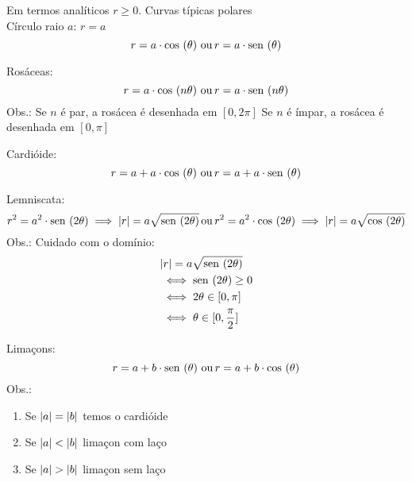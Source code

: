 \documentclass{article}
\begin{document}
    Em termos analíticos $r \ge 0$.
    Curvas típicas polares \\

       Círculo raio $a$: $r = a$ \\
       $$
            r = a \cdot \mathrm{cos}\, \left( \theta \right) \, \mathrm{ou} \, r = a \cdot \mathrm{sen}\, \left( \theta \right)
       $$
       
       
       Rosáceas: 
       \begin{equation*}
           r = a \cdot \mathrm{cos}\, \left( n \theta \right)\, \mathrm{ ou} \,
           r = a \cdot \mathrm{sen}\, \left( n \theta \right)
       \end{equation*}
       Obs.: Se $n$ é par, a rosácea é desenhada em $ [ 0, 2 \pi ]$
             Se $n$ é ímpar, a rosácea é desenhada em $ [ 0, \pi ]$
       
       
       Cardióide: 
       \begin{equation*}
            r = a + a \cdot \mathrm{cos}\, \left( \theta \right)\, \mathrm{ou}\, r = a + a \cdot \mathrm{sen}\, \left( \theta \right)
       \end{equation*}

       
       Lemniscata: 
       \begin{equation*}
           r^2 = a^2 \cdot \mathrm{sen}\, \left( 2\theta \right) \implies \lvert r \rvert = a \sqrt{ \mathrm{sen}\, \left( 2\theta \right) } \, \mathrm{ou} \, r^2 = a^2 \cdot \mathrm{cos}\, \left( 2\theta \right) \implies \lvert r \rvert = a \sqrt{ \mathrm{cos}\, \left( 2\theta \right) } \\
       \end{equation*}
       Obs.: Cuidado com o domínio: 
       \begin{align*}
            & \lvert r \rvert = a \sqrt{ \mathrm{sen}\, \left( 2 \theta \right) } \\
            & \iff \mathrm{sen}\, \left( 2 \theta \right) \ge 0  \\
            & \iff 2 \theta \in [0, \pi] \\
            & \iff \theta \in [0, \frac{\pi}{2} ] \\
       \end{align*}
       
       
       Limaçons: \\
       $$
        r = a + b \cdot \mathrm{sen}\, \left( \theta \right) \, \mathrm{ou} \,
        r = a + b \cdot \mathrm{cos}\, \left( \theta \right) 
        $$
       Obs.:
       \begin{enumerate}[i]
           \item Se $\lvert a \rvert = \lvert b \rvert$ temos o cardióide
           \item Se $\lvert a \rvert < \lvert b \rvert$ limaçon com laço
           \item Se $\lvert a \rvert > \lvert b \rvert$ limaçon sem laço
       \end{enumerate}
\end{document}
